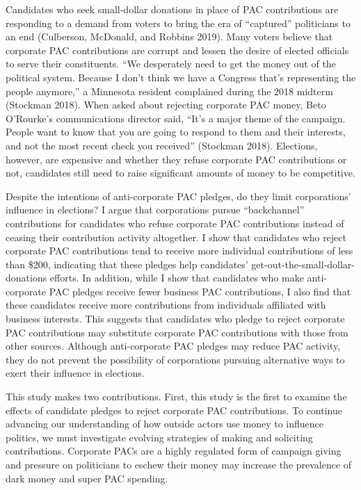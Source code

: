 \documentclass[
  12pt,
]{article}
\begin{document}
Candidates who seek small-dollar donations in place of PAC contributions are responding to a demand from voters to bring the era of ``captured'' politicians to an end (Culberson, McDonald, and Robbins 2019). Many voters believe that corporate PAC contributions are corrupt and lessen the desire of elected officials to serve their constituents. ``We desperately need to get the money out of the political system. Because I don't think we have a Congress that's representing the people anymore,'' a Minnesota resident complained during the 2018 midterm (Stockman 2018). When asked about rejecting corporate PAC money, Beto O'Rourke's communications director said, ``It's a major theme of the campaign. People want to know that you are going to respond to them and their interests, and not the most recent check you received'' (Stockman 2018). Elections, however, are expensive and whether they refuse corporate PAC contributions or not, candidates still need to raise significant amounts of money to be competitive.

Despite the intentions of anti-corporate PAC pledges, do they limit corporations' influence in elections? I argue that corporations pursue ``backchannel'' contributions for candidates who refuse corporate PAC contributions instead of ceasing their contribution activity altogether. I show that candidates who reject corporate PAC contributions tend to receive more individual contributions of less than \$200, indicating that these pledges help candidates' get-out-the-small-dollar-donations efforts. In addition, while I show that candidates who make anti-corporate PAC pledges receive fewer business PAC contributions, I also find that these candidates receive more contributions from individuals affiliated with business interests. This suggests that candidates who pledge to reject corporate PAC contributions may substitute corporate PAC contributions with those from other sources. Although anti-corporate PAC pledges may reduce PAC activity, they do not prevent the possibility of corporations pursuing alternative ways to exert their influence in elections.

This study makes two contributions. First, this study is the first to examine the effects of candidate pledges to reject corporate PAC contributions. To continue advancing our understanding of how outside actors use money to influence politics, we must investigate evolving strategies of making and soliciting contributions. Corporate PACs are a highly regulated form of campaign giving and pressure on politicians to eschew their money may increase the prevalence of dark money and super PAC spending.
\end{document}
